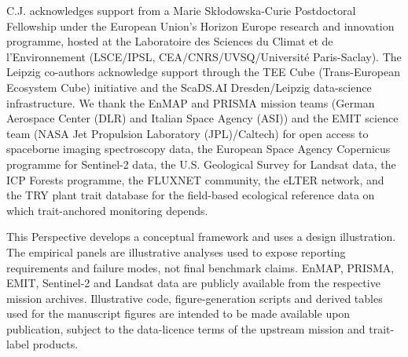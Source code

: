 \documentclass[pdflatex,sn-mathphys-num]{sn-jnl}
\begin{document}
C.J. acknowledges support from a Marie Sk\l{}odowska-Curie Postdoctoral Fellowship under the European Union's Horizon Europe research and innovation programme, hosted at the Laboratoire des Sciences du Climat et de l'Environnement (LSCE/IPSL, CEA/CNRS/UVSQ/Universit\'e Paris-Saclay). The Leipzig co-authors acknowledge support through the TEE Cube (Trans-European Ecosystem Cube) initiative and the ScaDS.AI Dresden/Leipzig data-science infrastructure. We thank the EnMAP and PRISMA mission teams (German Aerospace Center (DLR) and Italian Space Agency (ASI)) and the EMIT science team (NASA Jet Propulsion Laboratory (JPL)/Caltech) for open access to spaceborne imaging spectroscopy data, the European Space Agency Copernicus programme for Sentinel-2 data, the U.S. Geological Survey for Landsat data, the ICP Forests programme, the FLUXNET community, the eLTER network, and the TRY plant trait database for the field-based ecological reference data on which trait-anchored monitoring depends.

This Perspective develops a conceptual framework and uses a design illustration. The empirical panels are illustrative analyses used to expose reporting requirements and failure modes, not final benchmark claims. EnMAP, PRISMA, EMIT, Sentinel-2 and Landsat data are publicly available from the respective mission archives. Illustrative code, figure-generation scripts and derived tables used for the manuscript figures are intended to be made available upon publication, subject to the data-licence terms of the upstream mission and trait-label products.


\end{document}
